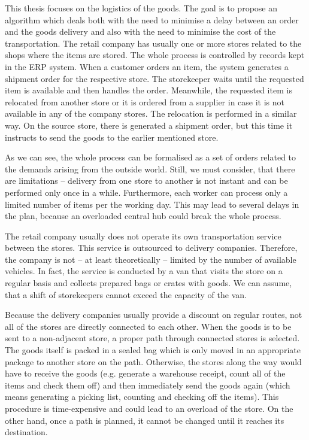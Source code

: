 This thesis focuses on the logistics of the goods. The goal is to propose an algorithm which deals both with the need to minimise a delay between an order and the goods delivery 
and also with the need to minimise the cost of the transportation. The retail company has usually one or more stores related to the shops where the items are stored.
The whole process is controlled by records kept in the ERP system. When a customer orders an item, the system generates a shipment order for the respective store.
The storekeeper waits until the requested item is available and then handles the order. Meanwhile, the requested item is relocated from another store or it is ordered from 
a supplier in case it is not available in any of the company stores. The relocation is performed in a similar way. On the source store, there is generated a shipment order, but this time
it instructs to send the goods to the earlier mentioned store.

As we can see, the whole process can be formalised as a set of orders related to the demands arising from the outside world. Still, we must consider, that there are limitations -- 
delivery from one store to another is not instant and can be performed only once in a while. Furthermore, each worker can process only a limited number of items per the working day.
This may lead to several delays in the plan, because an overloaded central hub could break the whole process.

The retail company usually does not operate its own transportation service between the stores. This service is outsourced to delivery companies. Therefore, the company is not -- at least
theoretically -- limited by the number of available vehicles. In fact, the service is conducted by a van that visits the store on a regular basis and collects prepared bags or crates with goods.
We can assume, that a shift of storekeepers cannot exceed the capacity of the van.

Because the delivery companies usually provide a discount on regular routes, not all of the stores are directly connected to each other. When the goods is to be sent to a non-adjacent store,
a proper path through connected stores is selected. The goods itself is packed in a sealed bag which is only moved in an appropriate package to another store on the path. Otherwise, the stores
along the way would have to receive the goods (e.g. generate a warehouse receipt, count all of the items and check them off) and then immediately send the goods again (which means generating a 
picking list, counting and checking off the items). This procedure is time-expensive and could lead to an overload of the store. On the other hand, once a path is planned, it cannot be changed until 
it reaches its destination.

